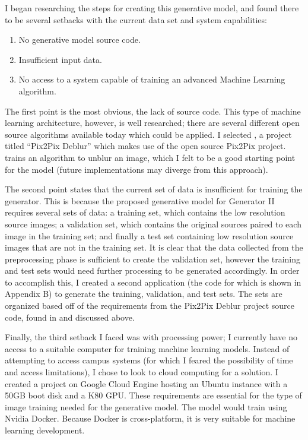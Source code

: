 \documentclass[conference]{IEEEtran}
\begin{document}
I began researching the steps for creating this generative model,
and found there to be several setbacks
with the current data set and system capabilities:

\begin{enumerate}
\item No generative model source code.
\item Insufficient input data.
\item No access to a system capable of training an advanced Machine
Learning algorithm.
\end{enumerate}

The first point is the most obvious, the lack of source code. This type of
machine learning architecture, however, is well researched; there are several
different open source algorithms available today which could be applied.
I selected \cite{ref:pix2pix_deblur}, a project titled ``Pix2Pix Deblur''
which makes use of the open source \cite{ref:pix2pix} Pix2Pix project.
\cite{ref:pix2pix_deblur} trains an algorithm to unblur an image, which I felt
to be a good starting point for the model (future implementations may
diverge from this approach).

The second point states that the current set of data is insufficient for
training the generator. This is because the proposed generative model for Generator II
requires several sets of data: a training set, which
contains the low resolution source images; a validation set, which contains the
original sources paired to each image in the training set; and finally a test set
containing low resolution source images that are not in the training set.
It is clear that
the data collected from the preprocessing phase is sufficient to
create the validation set, however the training and test sets would need further
processing to be generated accordingly. In order to accomplish this, I created a
second application (the code for which is shown in Appendix B) to generate the
training, validation, and test sets. The sets are organized based off of the
requirements from the
Pix2Pix Deblur project source code, found in \cite{ref:pix2pix_deblur} and
discussed above.

Finally, the third setback I faced was with processing power; I currently have
no access to a suitable computer for training machine learning models. Instead
of attempting to access campus systems (for which I feared the possibility of
time and access limitations), I chose to look to cloud computing for a solution.
I created a project on Google Cloud Engine hosting an Ubuntu instance with a
50GB boot disk and a K80 GPU. These requirements are essential for the type of
image training needed for the generative model. The model would train using
Nvidia Docker. Because Docker is cross-platform, it is very suitable for
machine learning development.
\end{document}

